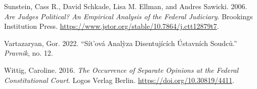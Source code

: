 \documentclass[
  11pt,
]{article}
\newlength{\cslhangindent}
\newenvironment{CSLReferences}[2] %
 {%
  \setlength{\parindent}{0pt}
  \ifodd #1 \everypar{\setlength{\hangindent}{\cslhangindent}}\ignorespaces\fi
  \ifnum #2 > 0
  \setlength{\parskip}{#2\baselineskip}
  \fi
 }%
 {}
\begin{document}
\begin{CSLReferences}{1}{0}
\leavevmode{}%
Sunstein, Cass R., David Schkade, Lisa M. Ellman, and Andres Sawicki.
2006. \emph{Are {Judges Political}? {An Empirical Analysis} of the
{Federal Judiciary}}. {Brookings Institution Press}.
\url{https://www.jstor.org/stable/10.7864/j.ctt12879t7}.

\leavevmode{}%
Vartazaryan, Gor. 2022. {``Sít'ová Analỳza Disentujících Ústavních
Soudců.''} \emph{Pravnik}, no. 12.

\leavevmode{}%
Wittig, Caroline. 2016. \emph{The {Occurrence} of {Separate Opinions} at
the {Federal Constitutional Court}}. {Logos Verlag Berlin}.
\url{https://doi.org/10.30819/4411}.

\end{CSLReferences}
\end{document}
